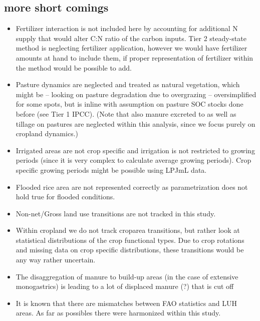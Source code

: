 \documentclass[gc, manuscript]{copernicus}
\begin{document}
\hypertarget{more-short-comings}{%
\subsection{more short comings}\label{more-short-comings}}

\begin{itemize}
\item
  Fertilizer interaction is not included here by accounting for additional N supply that would alter C:N ratio of the carbon inputs. Tier 2 steady-state method is neglecting fertilizer application, however we would have fertilizer amounts at hand to include them, if proper representation of fertilizer within the method would be possible to add.
\item
  Pasture dynamics are neglected and treated as natural vegetation, which might be -- looking on pasture degradation due to overgrazing -- oversimplified for some spots, but is inline with assumption on pasture SOC stocks done before (see Tier 1 IPCC). (Note that also manure excreted to as well as tillage on pastures are neglected within this analysis, since we focus purely on cropland dynamics.)
\item
  Irrigated areas are not crop specific and irrigation is not restricted to growing periods (since it is very complex to calculate average growing periods). Crop specific growing periods might be possible using LPJmL data.
\item
  Flooded rice area are not represented correctly as parametrization does not hold true for flooded conditions.
\item
  Non-net/Gross land use transitions are not tracked in this study.
\item
  Within cropland we do not track croparea transitions, but rather look at statistical distributions of the crop functional types. Due to crop rotations and missing data on crop specific distributions, these transitions would be any way rather uncertain.
\item
  The disaggregation of manure to build-up areas (in the case of extensive monogastrics) is leading to a lot of displaced manure (?) that is cut off
\item
  It is known that there are mismatches between FAO statistics and LUH areas. As far as possibles there were harmonized within this study.
  \newpage
\end{itemize}




\end{document}
